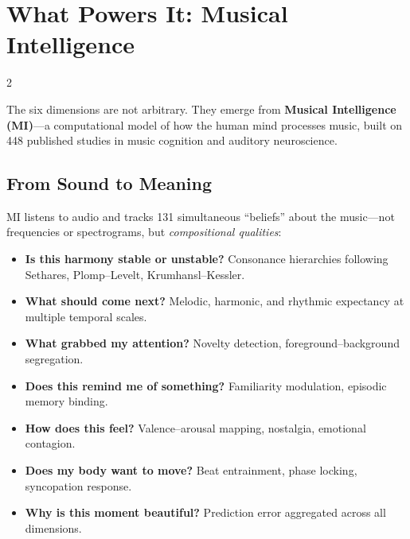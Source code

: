\documentclass[10pt,a4paper]{article}
\begin{document}
\newpage

\section{What Powers It: Musical Intelligence}

\vspace{2pt}

\begin{multicols}{2}

The six dimensions are not arbitrary. They emerge from \textbf{Musical Intelligence (MI)}---a computational model of how the human mind processes music, built on 448 published studies in music cognition and auditory neuroscience.

\subsection{From Sound to Meaning}

MI listens to audio and tracks 131 simultaneous ``beliefs'' about the music---not frequencies or spectrograms, but \emph{compositional qualities}:

\begin{itemize}[itemsep=3pt]
  \item \textbf{Is this harmony stable or unstable?} Consonance hierarchies following Sethares, Plomp--Levelt, Krumhansl--Kessler.
  \item \textbf{What should come next?} Melodic, harmonic, and rhythmic expectancy at multiple temporal scales.
  \item \textbf{What grabbed my attention?} Novelty detection, foreground--background segregation.
  \item \textbf{Does this remind me of something?} Familiarity modulation, episodic memory binding.
  \item \textbf{How does this feel?} Valence--arousal mapping, nostalgia, emotional contagion.
  \item \textbf{Does my body want to move?} Beat entrainment, phase locking, syncopation response.
  \item \textbf{Why is this moment beautiful?} Prediction error aggregated across all dimensions.
\end{itemize}

\columnbreak


\end{multicols}
\end{document}

